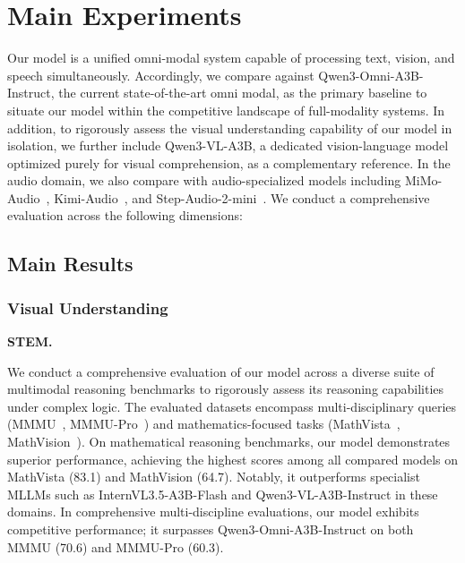 

\section{Main Experiments}
Our model is a unified omni-modal system capable of processing text, vision, and speech simultaneously. Accordingly,
we compare against Qwen3-Omni-A3B-Instruct, the current state-of-the-art omni modal, as the primary baseline to
situate our model within the competitive landscape of full-modality systems. In addition, to rigorously assess the visual
understanding capability of our model in isolation, we further include Qwen3-VL-A3B, a dedicated vision-language
model optimized purely for visual comprehension, as a complementary reference. In the audio domain, we also compare with audio-specialized models including MiMo-Audio~\cite{zhang2025mimo}, Kimi-Audio~\cite{ding2025kimi}, and Step-Audio-2-mini~\cite{wu2025step}. We conduct a comprehensive evaluation across the following dimensions:






\subsection{Main Results}




\subsubsection{Visual Understanding}
\textbf{STEM.}

We conduct a comprehensive evaluation of our model across a diverse suite of multimodal reasoning benchmarks to rigorously assess its reasoning capabilities under complex logic. 
The evaluated datasets encompass multi-disciplinary queries (MMMU~\cite{yue2024mmmu}, MMMU-Pro~\cite{yue2025mmmu}) and mathematics-focused tasks (MathVista~\cite{lu2023mathvista}, MathVision~\cite{wang2024measuring}).
On mathematical reasoning benchmarks, our model demonstrates superior performance, achieving the highest scores among all compared models on MathVista (83.1) and MathVision (64.7). Notably, it outperforms specialist MLLMs such as InternVL3.5-A3B-Flash and Qwen3-VL-A3B-Instruct in these domains. In comprehensive multi-discipline evaluations, our model exhibits competitive performance; it surpasses Qwen3-Omni-A3B-Instruct on both MMMU (70.6) and MMMU-Pro (60.3).


